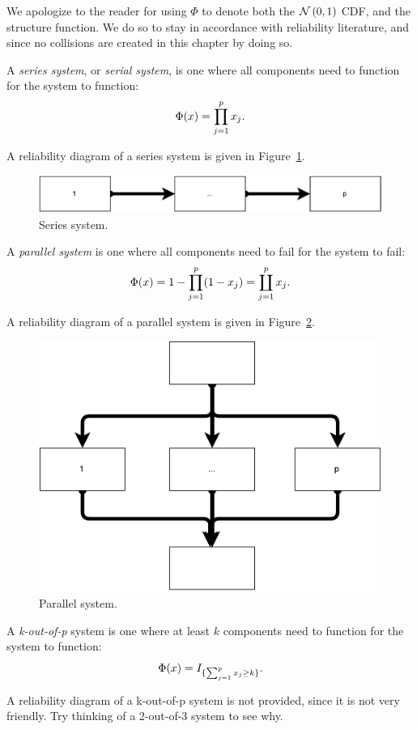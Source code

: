 \begin{remark}[$\Phi$]
We apologize to the reader for using $\Phi$ to denote both the $\mathcal{N}\left(0,1\right)$ CDF, and the structure function.
We do so to stay in accordance with reliability literature, and since no collisions are created in this chapter by doing so.
\end{remark}

\begin{definition}
A \emph{series system}, or \emph{serial system}, is one where all components need to function for the system to function: $$\Phi(x)=\prod_{j=1}^{p}x_j.$$
\end{definition}
A reliability diagram of a series system is given in Figure~\ref{fig:series_system}.
\begin{figure}[ht]
\centering
\includegraphics[width=0.5\linewidth]{art/series_system}
\caption{Series system.}
\label{fig:series_system}
\end{figure}


\begin{definition}
A \emph{parallel system} is one where all components need to fail for the system to fail:
$$\Phi(x)=1-\prod_{j=1}^{p} (1-x_j)= \coprod_{j=1}^p x_j.$$
\end{definition}
A reliability diagram of a parallel system is given in Figure~\ref{fig:parallel_system}.
\begin{figure}[ht]
\centering
\includegraphics[width=0.5\linewidth]{art/parallel_system}
\caption{Parallel system.}
\label{fig:parallel_system}
\end{figure}





\begin{definition}
A \emph{k-out-of-p} system is one where at least $k$ components need to function for the system to function:
$$\Phi(x)=I_{\{ \sum_{j=1}^{p} x_j \geq k \}}.$$
\end{definition}
A reliability diagram of a k-out-of-p system is not provided, since it is not very friendly. Try thinking of a 2-out-of-3 system to see why.




